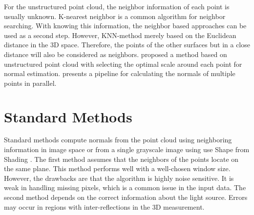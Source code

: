 For the unstructured point cloud, the neighbor information of each point is usually unknown. K-nearest neighbor is a common algorithm for neighbor searching. With knowing this information, the neighbor based approaches can be used as a second step. However, KNN-method merely based on the Euclidean distance in the 3D space. Therefore, the points of the other surfaces but in a close distance will also be considered as neighbors. \cite{unstructed-pc} proposed a method based on unstructured point cloud with selecting the optimal scale around each point for normal estimation. \cite{unstructed-pc-patch-stitching} presents a pipeline for calculating the normals of multiple points in parallel. 



\section{Standard Methods}

Standard methods compute normals from the point cloud using neighboring information in image space or from a single grayscale image using use Shape from Shading \cite{SFS}. The first method assumes that the neighbors of the points locate on the same plane. This method performs well with a well-chosen window size. However, the drawbacks are that the algorithm is highly noise sensitive. It is weak in handling missing pixels, which is a common issue in the input data. The second method depends on the correct information about the light source. Errors may occur in regions with inter-reflections in the 3D measurement. 



